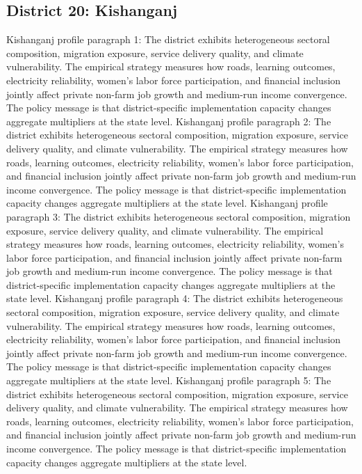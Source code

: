 \documentclass[preprint,12pt]{elsarticle}
\begin{document}
\subsection{District 20: Kishanganj}
Kishanganj profile paragraph 1: The district exhibits heterogeneous sectoral composition, migration exposure, service delivery quality, and climate vulnerability. The empirical strategy measures how roads, learning outcomes, electricity reliability, women's labor force participation, and financial inclusion jointly affect private non-farm job growth and medium-run income convergence. The policy message is that district-specific implementation capacity changes aggregate multipliers at the state level.
Kishanganj profile paragraph 2: The district exhibits heterogeneous sectoral composition, migration exposure, service delivery quality, and climate vulnerability. The empirical strategy measures how roads, learning outcomes, electricity reliability, women's labor force participation, and financial inclusion jointly affect private non-farm job growth and medium-run income convergence. The policy message is that district-specific implementation capacity changes aggregate multipliers at the state level.
Kishanganj profile paragraph 3: The district exhibits heterogeneous sectoral composition, migration exposure, service delivery quality, and climate vulnerability. The empirical strategy measures how roads, learning outcomes, electricity reliability, women's labor force participation, and financial inclusion jointly affect private non-farm job growth and medium-run income convergence. The policy message is that district-specific implementation capacity changes aggregate multipliers at the state level.
Kishanganj profile paragraph 4: The district exhibits heterogeneous sectoral composition, migration exposure, service delivery quality, and climate vulnerability. The empirical strategy measures how roads, learning outcomes, electricity reliability, women's labor force participation, and financial inclusion jointly affect private non-farm job growth and medium-run income convergence. The policy message is that district-specific implementation capacity changes aggregate multipliers at the state level.
Kishanganj profile paragraph 5: The district exhibits heterogeneous sectoral composition, migration exposure, service delivery quality, and climate vulnerability. The empirical strategy measures how roads, learning outcomes, electricity reliability, women's labor force participation, and financial inclusion jointly affect private non-farm job growth and medium-run income convergence. The policy message is that district-specific implementation capacity changes aggregate multipliers at the state level.
\end{document}
